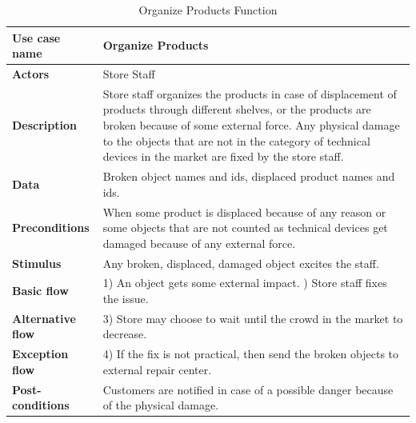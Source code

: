  \begin{table}[H]
     \centering
     \begin{tabular}{ | l | p{10cm} |}
     \hline
     \textbf{Use case name}    & Organize Products \\
     \hline
     \textbf{Actors}           & Store Staff \\
     \hline
     \textbf{Description}      & Store staff organizes the products in case of displacement of products through different shelves, or the products are broken because of some external force. Any physical damage to the objects that are not in the category of technical devices in the market are fixed by the store staff. \\
     \hline
     \textbf{Data}             & Broken object names and ids, displaced product names and ids. \\
     \hline
     \textbf{Preconditions}    & When some product is displaced because of any reason or some objects that are not counted as technical devices get damaged because of any external force.  \\
     \hline
     \textbf{Stimulus}         & Any broken, displaced, damaged object excites the staff. \\
     \hline
     \textbf{Basic flow}       & 1) An object gets some external impact. \newline 2) Store staff fixes the issue. \\
     \hline
     \textbf{Alternative flow} & 3) Store may choose to wait until the crowd in the market to decrease. \\
     \hline
     \textbf{Exception flow}   & 4) If the fix is not practical, then send the broken objects to external repair center. \\
     \hline
     \textbf{Post-conditions}  & Customers are notified in case of a possible danger because of the physical damage. \\
     \hline
     \end{tabular}
     \caption{Organize Products Function}
     \label{tab:03organize_products}
 \end{table}
 

